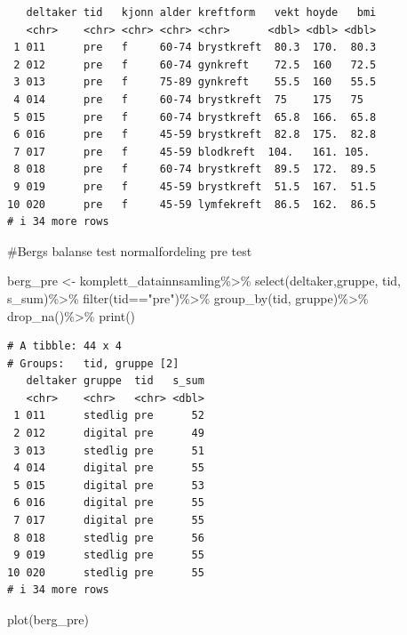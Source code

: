 \documentclass[
  letterpaper,
  DIV=11,
  numbers=noendperiod]{scrreprt}
\newenvironment{Shaded}{\begin{snugshade}}{\end{snugshade}}
\newcommand{\FunctionTok}[1]{\textcolor[rgb]{0.28,0.35,0.67}{#1}}
\newcommand{\NormalTok}[1]{\textcolor[rgb]{0.00,0.23,0.31}{#1}}
\newcommand{\OtherTok}[1]{\textcolor[rgb]{0.00,0.23,0.31}{#1}}
\newcommand{\SpecialCharTok}[1]{\textcolor[rgb]{0.37,0.37,0.37}{#1}}
\newcommand{\StringTok}[1]{\textcolor[rgb]{0.13,0.47,0.30}{#1}}
\begin{document}
\begin{verbatim}
   deltaker tid   kjonn alder kreftform   vekt hoyde   bmi
   <chr>    <chr> <chr> <chr> <chr>      <dbl> <dbl> <dbl>
 1 011      pre   f     60-74 brystkreft  80.3  170.  80.3
 2 012      pre   f     60-74 gynkreft    72.5  160   72.5
 3 013      pre   f     75-89 gynkreft    55.5  160   55.5
 4 014      pre   f     60-74 brystkreft  75    175   75  
 5 015      pre   f     60-74 brystkreft  65.8  166.  65.8
 6 016      pre   f     45-59 brystkreft  82.8  175.  82.8
 7 017      pre   f     45-59 blodkreft  104.   161. 105. 
 8 018      pre   f     60-74 brystkreft  89.5  172.  89.5
 9 019      pre   f     45-59 brystkreft  51.5  167.  51.5
10 020      pre   f     45-59 lymfekreft  86.5  162.  86.5
# i 34 more rows
\end{verbatim}

\#Bergs balanse test normalfordeling pre test

\begin{Shaded}
\begin{Highlighting}[]
\NormalTok{berg\_pre }\OtherTok{\textless{}{-}}\NormalTok{ komplett\_datainnsamling}\SpecialCharTok{\%\textgreater{}\%}
  \FunctionTok{select}\NormalTok{(deltaker,gruppe, tid, s\_sum)}\SpecialCharTok{\%\textgreater{}\%}
  \FunctionTok{filter}\NormalTok{(tid}\SpecialCharTok{==}\StringTok{"pre"}\NormalTok{)}\SpecialCharTok{\%\textgreater{}\%}
  \FunctionTok{group\_by}\NormalTok{(tid, gruppe)}\SpecialCharTok{\%\textgreater{}\%}
  \FunctionTok{drop\_na}\NormalTok{()}\SpecialCharTok{\%\textgreater{}\%}
  \FunctionTok{print}\NormalTok{()}
\end{Highlighting}
\end{Shaded}

\begin{verbatim}
# A tibble: 44 x 4
# Groups:   tid, gruppe [2]
   deltaker gruppe  tid   s_sum
   <chr>    <chr>   <chr> <dbl>
 1 011      stedlig pre      52
 2 012      digital pre      49
 3 013      stedlig pre      51
 4 014      digital pre      55
 5 015      digital pre      53
 6 016      digital pre      55
 7 017      digital pre      55
 8 018      stedlig pre      56
 9 019      stedlig pre      55
10 020      stedlig pre      55
# i 34 more rows
\end{verbatim}

\begin{Shaded}
\begin{Highlighting}[]
\FunctionTok{plot}\NormalTok{(berg\_pre)}
\end{Highlighting}
\end{Shaded}
\end{document}
